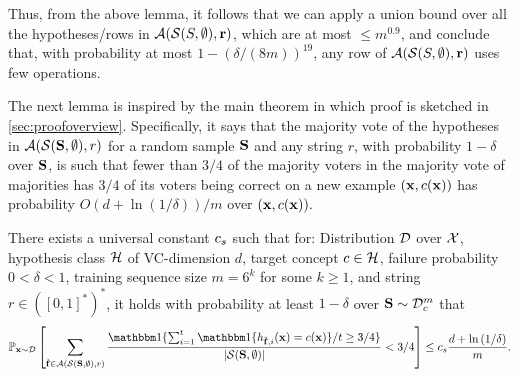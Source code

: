 Thus, from the above lemma, it follows that we can apply a union bound over all the hypotheses/rows in $\mathcal{A}(\mathcal{S}(S,\emptyset),\mathbf{r})$, which are at most $\leq m^{0.9}$, and conclude that, with probability at most $1-(\delta/(8m))^{19}$, any row of $\mathcal{A}(\mathcal{S}(S,\emptyset),\mathbf{r})$ uses few operations. 

The next lemma is inspired by the main theorem in \cite{hannekeoptimal} which proof is sketched in \cref{sec:proofoverview}. Specifically, it says that the majority vote of the hypotheses in $\mathcal{A}(\mathcal{S}(\mathbf{S},\emptyset),r)$ for a random sample $\mathbf{S}$ and any string $r$, with probability $1-\delta$ over $\mathbf{S}$, is such that fewer than $3/4$ of the majority voters in the majority vote of majorities has $3/4$ of its voters being correct on a new example $ (\mathbf{x},c(\mathbf{x})) $ has probability $O(d+\ln{\left(1/\delta \right)}  )/m$ over $ (\mathbf{x},c(\mathbf{x})).$

\begin{lemma}[\cref{induktionsteplemma} with $T=\emptyset$]\label{induktionsteplemmaeasy}
  There exists a universal constant $c_s$ such that for: Distribution $ \mathcal{D} $ over $ \mathcal{X} $, hypothesis class $ \mathcal{H} $ of VC-dimension $ d $, target concept $ c\in \mathcal{H} $,  failure probability $ 0<\delta<1 $, training sequence size $m=6^{k}$ for some $k\geq 1$, and string $r\in ([0,1]^{*})^{*}$, it holds with probability at least $1-\delta$ over $\mathbf{S}\sim \mathcal{D}_{c}^{m}$ that
     \begin{align*}
       \p_{\rx\sim \cD} \left[  
         \sum_{\rf\in \cA(\cS(\rS,\emptyset),r)} \frac{\ind\{\sum_{i=1}^{t} \ind\{h_{\rf,i}(\rx)=c(\rx)\}/t\geq 3/4\}}{|\cS(\rS,\emptyset)|}
          <3/4\right] \leq \cs \frac{d+\ln{\left(1/\delta \right)}}{m}.
     \end{align*}
\end{lemma}

